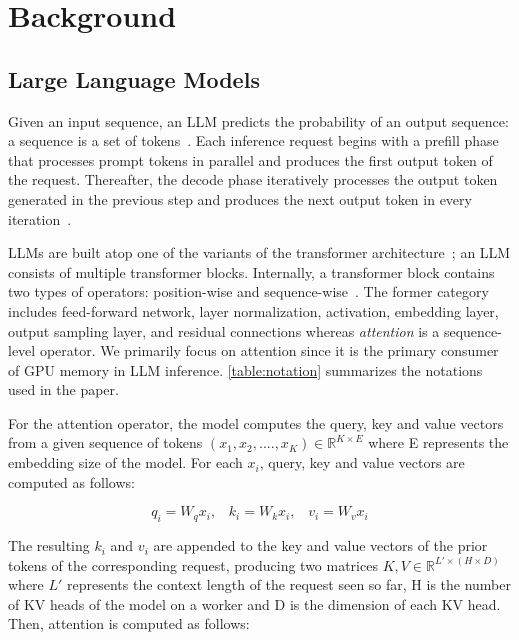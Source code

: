 \section{Background}
\label{sec:background}

\subsection{Large Language Models}

Given an input sequence, an LLM predicts the probability of an output sequence: a sequence is a set of tokens~\cite{vllmsosp}. Each inference request begins with a prefill phase that processes prompt tokens in parallel and produces the first output token of the request. Thereafter, the decode phase iteratively processes the output token generated in the previous step and produces the next output token in every iteration~\cite{sarathi2023}. 

LLMs are built atop one of the variants of the transformer architecture~\cite{attentionpaper}; an LLM consists of multiple transformer blocks. Internally, a transformer block contains two types of operators: position-wise and sequence-wise~\cite{orca}. The former category includes feed-forward network, layer normalization, activation, embedding layer, output sampling layer, and residual connections  whereas \textit{attention} is a sequence-level operator. We primarily focus on attention since it is the primary consumer of GPU memory in LLM inference. \autoref{table:notation} summarizes the notations used in the paper.


For the attention operator, the model computes the query, key and value vectors from a given sequence of tokens
$(x_1, x_2,...., x_K)\in\mathbb{R}^{K\times E}$
where E represents the embedding size of the model. For each $x_i$, query, key and value vectors are computed as follows:

\begin{equation}
    q_{i} = W_{q}x_{i},\;\;\; k_{i} = W_{k}x_{i}, \;\;\; v_{i} = W_{v}x_{i} 
\end{equation}

The resulting $k_{i}$ and $v_{i}$ are appended to the key and value vectors of the prior tokens of the corresponding request, producing two matrices $K, V \in \mathbb R^{L'\times (H\times D)}$ where $L'$ represents the context length of the request seen so far, H is the number of KV heads of the model on a worker and D is the dimension of each KV head. Then, attention is computed as follows:

